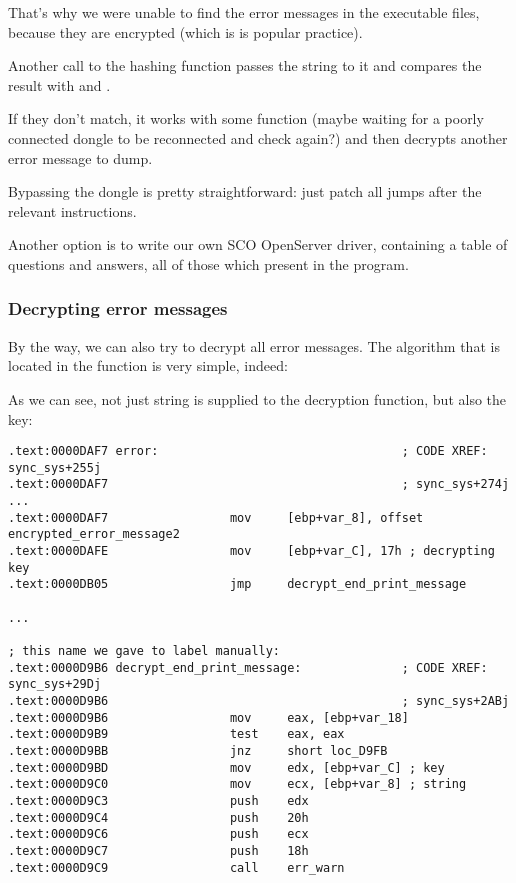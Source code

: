 That's why we were unable to find the error messages in the executable files, because they are encrypted
(which is is popular practice).

Another call to the  hashing function passes the
 string to it and compares the result with
 and .

If they don't match, it works with some  
function (maybe waiting for a poorly
connected dongle to be reconnected and check again?) and then decrypts another error message to dump.



Bypassing the dongle is pretty straightforward: just patch all jumps after the relevant \CMP instructions.

Another option is to write our own SCO OpenServer driver, containing a table of questions and answers, all of those which present in the program.

\subsubsection{Decrypting error messages}

By the way, we can also try to decrypt all error messages.
The algorithm that is located in the  function is very simple, indeed:



As we can see, 
not just string is supplied to the decryption function, but also the key:

\begin{lstlisting}[style=customasmx86]
.text:0000DAF7 error:                                  ; CODE XREF: sync_sys+255j
.text:0000DAF7                                         ; sync_sys+274j ...
.text:0000DAF7                 mov     [ebp+var_8], offset encrypted_error_message2
.text:0000DAFE                 mov     [ebp+var_C], 17h ; decrypting key
.text:0000DB05                 jmp     decrypt_end_print_message

...

; this name we gave to label manually:
.text:0000D9B6 decrypt_end_print_message:              ; CODE XREF: sync_sys+29Dj
.text:0000D9B6                                         ; sync_sys+2ABj
.text:0000D9B6                 mov     eax, [ebp+var_18]
.text:0000D9B9                 test    eax, eax
.text:0000D9BB                 jnz     short loc_D9FB
.text:0000D9BD                 mov     edx, [ebp+var_C] ; key
.text:0000D9C0                 mov     ecx, [ebp+var_8] ; string
.text:0000D9C3                 push    edx
.text:0000D9C4                 push    20h
.text:0000D9C6                 push    ecx
.text:0000D9C7                 push    18h
.text:0000D9C9                 call    err_warn
\end{lstlisting}


